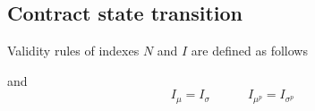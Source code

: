 \documentclass{llncs}
\begin{document}
\subsection{Contract state transition} Validity rules of indexes $N$ and $I$ are defined as follows

and
$$I_\mu = I_\sigma \quad\quad\quad  I_{\mu^p} = I_{\sigma^p}$$



%
%
\printbibliography
\end{document}

